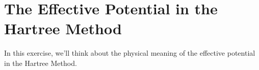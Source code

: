 %
%
%
%

\section*{The Effective Potential in the Hartree Method}
	
	In this exercise, we'll think about the physical meaning of the effective potential in the Hartree Method.

